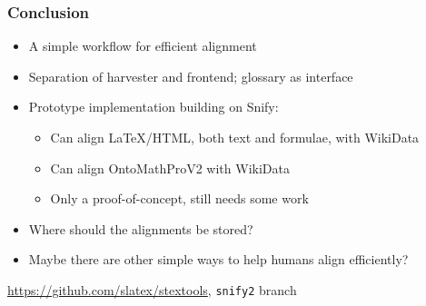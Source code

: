 \documentclass[aspectratio=169]{beamer}
\begin{document}
\begin{frame}
    \frametitle{Conclusion}
    \begin{itemize}
        \item A simple workflow for efficient alignment
        \item Separation of harvester and frontend; glossary as interface
        \item Prototype implementation building on Snify:
            \begin{itemize}
                \item Can align \LaTeX/HTML, both text and formulae, with WikiData
                \item Can align OntoMathProV2 with WikiData
                \item Only a proof-of-concept, still needs some work
            \end{itemize}
        \item Where should the alignments be stored?
        \item Maybe there are other simple ways to help humans align efficiently?
    \end{itemize}

    \vspace{2em}
    \centering
    \textcolor{blue}{\url{https://github.com/slatex/stextools}}, \texttt{snify2} branch
\end{frame}
\end{document}
